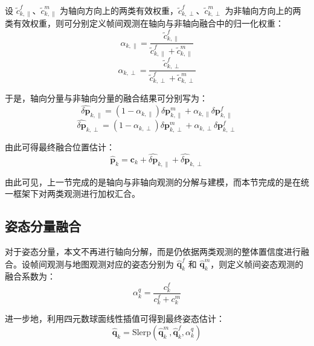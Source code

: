 设 $\tilde{c}_{k,\parallel}^{f}$、$\tilde{c}_{k,\parallel}^{m}$ 为轴向方向上的两类有效权重，$\tilde{c}_{k,\perp}^{f}$、$\tilde{c}_{k,\perp}^{m}$ 为非轴向方向上的两类有效权重，则可分别定义帧间观测在轴向与非轴向融合中的归一化权重：
\begin{equation}
\alpha_{k,\parallel}
=
\frac{\tilde{c}_{k,\parallel}^{f}}
{\tilde{c}_{k,\parallel}^{f}+\tilde{c}_{k,\parallel}^{m}}
\end{equation}
\begin{equation}
\alpha_{k,\perp}
=
\frac{\tilde{c}_{k,\perp}^{f}}
{\tilde{c}_{k,\perp}^{f}+\tilde{c}_{k,\perp}^{m}}
\end{equation}

于是，轴向分量与非轴向分量的融合结果可分别写为：
\begin{equation}
\hat{\delta \mathbf{p}}_{k,\parallel}
=
\left(1-\alpha_{k,\parallel}\right)\delta \mathbf{p}_{k,\parallel}^{m}
+\alpha_{k,\parallel}\delta \mathbf{p}_{k,\parallel}^{f}
\end{equation}
\begin{equation}
\hat{\delta \mathbf{p}}_{k,\perp}
=
\left(1-\alpha_{k,\perp}\right)\delta \mathbf{p}_{k,\perp}^{m}
+\alpha_{k,\perp}\delta \mathbf{p}_{k,\perp}^{f}
\end{equation}

由此可得最终融合位置估计：
\begin{equation}
\hat{\mathbf{p}}_{k}
=
\mathbf{c}_{k}
+\hat{\delta \mathbf{p}}_{k,\parallel}
+\hat{\delta \mathbf{p}}_{k,\perp}
\end{equation}

由此可见，上一节完成的是轴向与非轴向观测的分解与建模，而本节完成的是在统一框架下对两类观测进行加权汇合。

\subsection{姿态分量融合}

对于姿态分量，本文不再进行轴向分解，而是仍依据两类观测的整体置信度进行融合。设帧间观测与地图观测对应的姿态分别为 $\hat{\mathbf{q}}_{k}^{f}$ 和 $\hat{\mathbf{q}}_{k}^{m}$，则定义帧间姿态观测的融合系数为：
\begin{equation}
\alpha_{k}^{q}
=
\frac{c_{k}^{f}}{c_{k}^{f}+c_{k}^{m}}
\end{equation}

进一步地，利用四元数球面线性插值可得到最终姿态估计：
\begin{equation}
\hat{\mathbf{q}}_{k}
=
\mathrm{Slerp}
\left(
\hat{\mathbf{q}}_{k}^{m},
\hat{\mathbf{q}}_{k}^{f},
\alpha_{k}^{q}
\right)
\end{equation}

